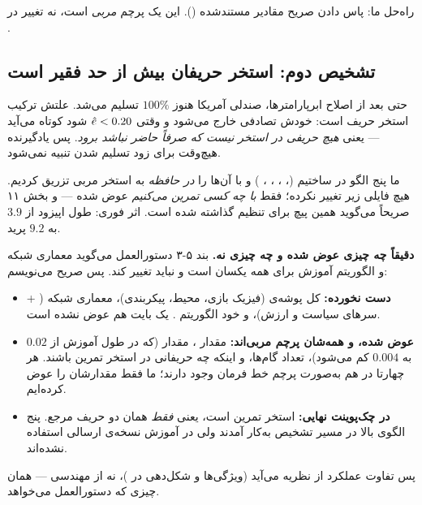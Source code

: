 \documentclass[12pt,a4paper]{article}
\begin{document}
راه‌حل ما: پاس دادن صریح مقادیر مستندشده
(). این یک پرچم \emph{مربی} است، نه تغییر
در .

\subsection{تشخیص دوم: استخر حریفان بیش از حد فقیر است}

حتی بعد از اصلاح ابرپارامترها، صندلی آمریکا هنوز $100\%$ تسلیم می‌شد. علتش
ترکیب استخر حریف است:  خودش تصادفی خارج می‌شود و 
وقتی $\hat{e}<0.20$ شود کوتاه می‌آید — یعنی \emph{هیچ حریفی در استخر نیست که
صرفاً حاضر نباشد برود}. پس یادگیرنده هیچ‌وقت برای زود تسلیم شدن تنبیه
نمی‌شود.

ما پنج الگو در  ساختیم
(‏، ، ، ، ) و
با  آن‌ها را \emph{در حافظه} به استخر مربی تزریق
کردیم. هیچ فایلی زیر  تغییر نکرده؛ فقط \emph{با چه کسی تمرین
می‌کنیم} عوض شده — و  بخش ۱۱ صریحاً می‌گوید همین پیچ برای
تنظیم گذاشته شده است. اثر فوری: طول اپیزود از $3.9$ به $9.2$ پرید.

\begin{answer}
\textbf{دقیقاً چه چیزی عوض شده و چه چیزی نه.} بند ۵-۳ دستورالعمل می‌گوید
معماری شبکه و الگوریتم آموزش برای همه یکسان است و نباید تغییر کند. پس صریح
می‌نویسم:
\begin{itemize}[leftmargin=1.3em,itemsep=1pt]
  \item \textbf{دست نخورده:} کل پوشه‌ی  (فیزیک بازی، محیط،
        پیکربندی)، معماری شبکه ( + سرهای سیاست و ارزش)، و خود
        الگوریتم . یک بایت هم عوض نشده است.
  \item \textbf{عوض شده، و همه‌شان پرچم مربی‌اند:} مقدار ،
        مقدار  (که در طول آموزش از $0.02$ به $0.004$
        کم می‌شود)، تعداد گام‌ها، و اینکه چه حریفانی در استخر تمرین باشند.
        هر چهارتا در  هم به‌صورت پرچم خط فرمان وجود
        دارند؛ ما فقط مقدارشان را عوض کرده‌ایم.
  \item \textbf{در چک‌پوینت نهایی:} استخر تمرین  است،
        یعنی \emph{فقط} همان دو حریف مرجع. پنج الگوی بالا در مسیر تشخیص
        به‌کار آمدند ولی در آموزش نسخه‌ی ارسالی استفاده نشده‌اند.
\end{itemize}
پس تفاوت عملکرد از نظریه می‌آید (ویژگی‌ها و شکل‌دهی در )، نه
از مهندسی — همان چیزی که دستورالعمل می‌خواهد.
\end{answer}
\end{document}

